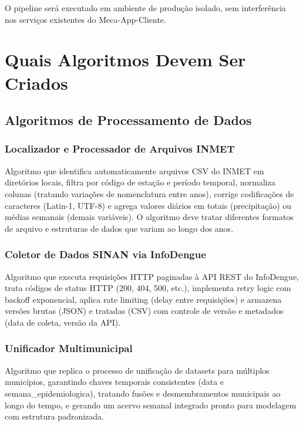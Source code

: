 O pipeline será executado em ambiente de produção isolado, sem interferência nos serviços existentes do Meca-App-Cliente.

\section{Quais Algoritmos Devem Ser Criados}

\subsection{Algoritmos de Processamento de Dados}

\subsubsection{Localizador e Processador de Arquivos INMET}

Algoritmo que identifica automaticamente arquivos CSV do INMET em diretórios locais, filtra por código de estação e período temporal, normaliza colunas (tratando variações de nomenclatura entre anos), corrige codificações de caracteres (Latin-1, UTF-8) e agrega valores diários em totais (precipitação) ou médias semanais (demais variáveis). O algoritmo deve tratar diferentes formatos de arquivo e estruturas de dados que variam ao longo dos anos.

\subsubsection{Coletor de Dados SINAN via InfoDengue}

Algoritmo que executa requisições HTTP paginadas à API REST do InfoDengue, trata códigos de status HTTP (200, 404, 500, etc.), implementa retry logic com backoff exponencial, aplica rate limiting (delay entre requisições) e armazena versões brutas (JSON) e tratadas (CSV) com controle de versão e metadados (data de coleta, versão da API).

\subsubsection{Unificador Multimunicipal}

Algoritmo que replica o processo de unificação de datasets para múltiplos municípios, garantindo chaves temporais consistentes (data e semana\_epidemiologica), tratando fusões e desmembramentos municipais ao longo do tempo, e gerando um acervo semanal integrado pronto para modelagem com estrutura padronizada.

